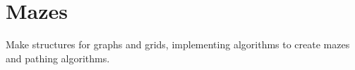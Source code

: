 \chapter{Mazes}
\hypertarget{md__r_e_a_d_m_e}{}\label{md__r_e_a_d_m_e}
\label{md__r_e_a_d_m_e_autotoc_md0}%
%


Make structures for graphs and grids, implementing algorithms to create mazes and pathing algorithms. 